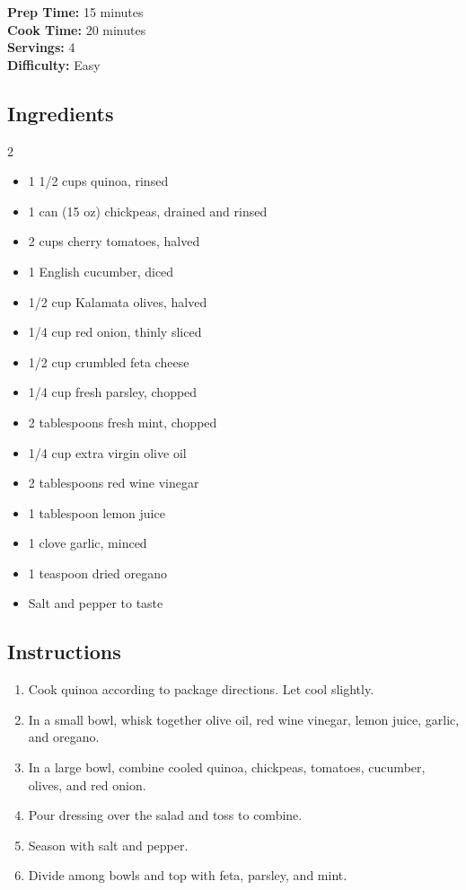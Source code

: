 \documentclass[
    language=english,
    doctype=recipe-book,
    institution=none,
]{../../omnilatex}
\begin{document}
\begin{recipebox}
\textbf{Prep Time:} 15 minutes\\
\textbf{Cook Time:} 20 minutes\\
\textbf{Servings:} 4\\
\textbf{Difficulty:} Easy
\end{recipebox}

\subsection*{Ingredients}

\begin{multicols}{2}
\begin{itemize}[leftmargin=*]
    \item 1 1/2 cups quinoa, rinsed
    \item 1 can (15 oz) chickpeas, drained and rinsed
    \item 2 cups cherry tomatoes, halved
    \item 1 English cucumber, diced
    \item 1/2 cup Kalamata olives, halved
    \item 1/4 cup red onion, thinly sliced
    \item 1/2 cup crumbled feta cheese
    \item 1/4 cup fresh parsley, chopped
    \item 2 tablespoons fresh mint, chopped
    \item 1/4 cup extra virgin olive oil
    \item 2 tablespoons red wine vinegar
    \item 1 tablespoon lemon juice
    \item 1 clove garlic, minced
    \item 1 teaspoon dried oregano
    \item Salt and pepper to taste
\end{itemize}
\end{multicols}

\subsection*{Instructions}

\begin{enumerate}
    \item Cook quinoa according to package directions. Let cool slightly.
    \item In a small bowl, whisk together olive oil, red wine vinegar, lemon juice, garlic, and oregano.
    \item In a large bowl, combine cooled quinoa, chickpeas, tomatoes, cucumber, olives, and red onion.
    \item Pour dressing over the salad and toss to combine.
    \item Season with salt and pepper.
    \item Divide among bowls and top with feta, parsley, and mint.
\end{enumerate}
\end{document}
